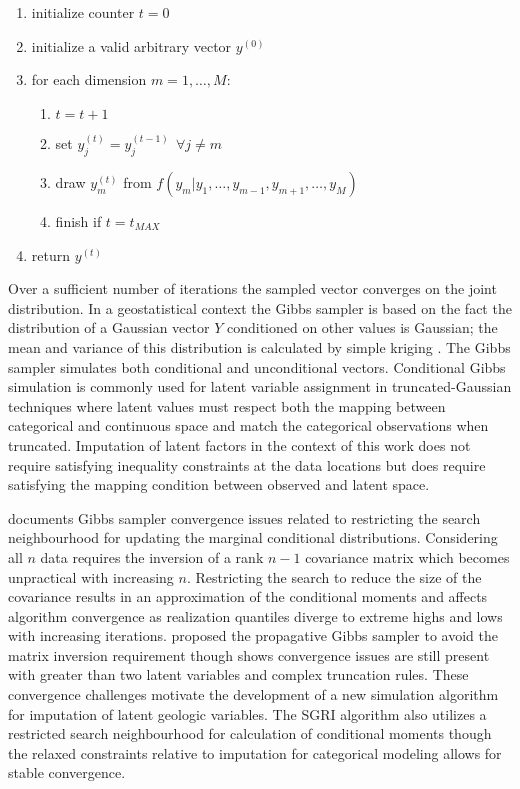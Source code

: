 \begin{enumerate}[noitemsep]
    \item initialize counter $t=0$
    \item initialize a valid arbitrary vector $y^{(0)}$
    \item for each dimension $m=1,\dots,M$:
          \begin{enumerate}[noitemsep]
              \item $t=t+1$
              \item set $y^{(t)}_{j} = y^{(t-1)}_{j} \ \ \forall j \neq m$
              \item draw $y^{(t)}_{m}$ from  $f(y_{m}|y_{1},\dots,y_{m-1},y_{m+1},\dots,y_{M})$
              \item finish if $t=t_{MAX}$
          \end{enumerate}
    \item return $y^{(t)}$
\end{enumerate}

Over a sufficient number of iterations the sampled vector converges on the joint distribution. In a geostatistical context the Gibbs sampler is based on the fact the distribution of a Gaussian vector $Y$ conditioned on other values is Gaussian; the mean and variance of this distribution is calculated by simple kriging \citep{emery2014simulating}. The Gibbs sampler simulates both conditional and unconditional vectors. Conditional Gibbs simulation is commonly used for latent variable assignment in truncated-Gaussian techniques \citep{armstrong2011plurigaussian,silva2017multiple} where latent values must respect both the mapping between categorical and continuous space and match the categorical observations when truncated. Imputation of latent factors in the context of this work does not require satisfying inequality constraints at the data locations but does require satisfying the mapping condition between observed and latent space.

\cite{silva2018enhanced} documents Gibbs sampler convergence issues related to restricting the search neighbourhood for updating the marginal conditional distributions. Considering all $n$ data requires the inversion of a rank $n-1$ covariance matrix which becomes unpractical with increasing $n$. Restricting the search to reduce the size of the covariance results in an approximation of the conditional moments and affects algorithm convergence \citep{emery2014simulating, lauzon2020sequential} as realization quantiles diverge to extreme highs and lows with increasing iterations. \cite{lantuejoul2012simulation} proposed the propagative Gibbs sampler to avoid the matrix inversion requirement though \cite{silva2018enhanced} shows convergence issues are still present with greater than two latent variables and complex truncation rules. These convergence challenges motivate the development of a new simulation algorithm for imputation of latent geologic variables. The \gls{SGRI} algorithm also utilizes a restricted search neighbourhood for calculation of conditional moments though the relaxed constraints relative to imputation for categorical modeling allows for stable convergence.

